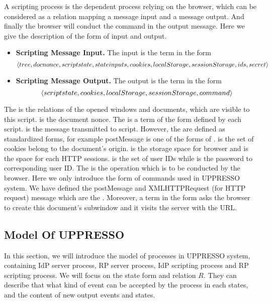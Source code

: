 \begin{appendices}
A scripting process is the dependent process relying on the browser, which can be considered as a relation  mapping a message input and a message output. And finally the browser will conduct the command in the output message. Here we give the description of the form of input and output. 
\begin{itemize}
\item \textbf{Scripting Message Input. } The input is the term in the form
\begin{equation*}
\langle {{}tree, docnonce, scriptstate, stateinputs,cookies,localStorage, sessionStorage, ids, secret} \rangle
\end{equation*}
\item \textbf{Scripting Message Output. }The output is the term in the form
\begin{equation*}
\langle {{}scriptstate, cookies, localStorage, sessionStorage, command} \rangle
\end{equation*}
\end{itemize}
The  is the relations of the opened windows and documents, which are visible to this script.  is the document nonce. The   is a term of the form defined by each script.  is the message transmitted to script. However, the  are defined as standardized forms, for example postMessage is one of the forms of .  is the set of cookies belong to the document's origin.  is the storage space for browser and  is the space for each HTTP sessions.   is the set of user IDs while  is the password to corresponding user ID. The  is the operation which is to be conducted by the browser. Here we only introduce the form of commands used in UPPRESSO system. We have defined the postMessage and XMLHTTPRequest (for HTTP request) message which are the . Moreover, a term in the form  asks the browser to create this document's subwindow and it visits the server with the URL.



\subsection{Model Of UPPRESSO}
In this section, we will introduce the model of processes in UPPRESSO system, containing IdP server process, RP server process, IdP scripting process and RP scripting process. We will focus on the state form and relation $R$. They can describe that what kind of event can be accepted by the process in each states, and the content of new output events and states.

\end{appendices}
